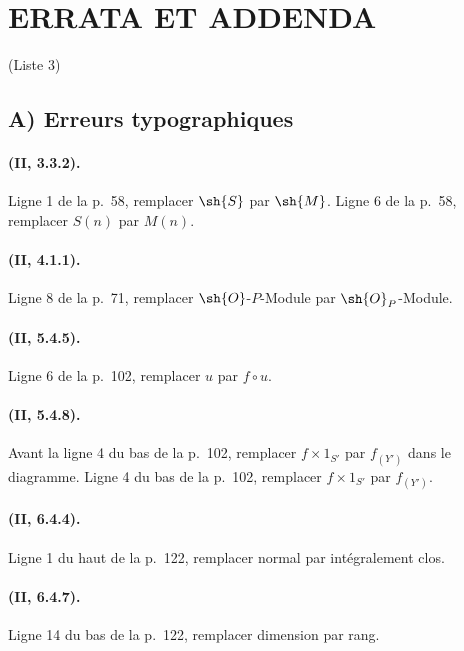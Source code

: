 {}
\section*{ERRATA ET ADDENDA}
\begin{center}\large (Liste 3)\end{center}

\subsection*{A) Erreurs typographiques}

\paragraph{(II, 3.3.2).}
Ligne 1 de la p.~58, remplacer $\sh{S}$ par $\sh{M}$. Ligne 6 de la
p.~58, remplacer $S(n)$ par $M(n)$.

\paragraph{(II, 4.1.1).}
Ligne 8 de la p.~71, remplacer $\sh{O}$-$P$-Module par
$\sh{O}_P$-Module.

\paragraph{(II, 5.4.5).}
Ligne 6 de la p.~102, remplacer $u$ par $f\circ u$.

\paragraph{(II, 5.4.8).}
Avant la ligne 4 du bas de la p.~102, remplacer $f\times1_{S'}$ par
$f_{(Y')}$ dans le diagramme. Ligne 4 du bas de la p.~102, remplacer
$f\times1_{S'}$ par $f_{(Y')}$.

\paragraph{(II, 6.4.4).}
Ligne 1 du haut de la p.~122, remplacer normal par intégralement clos.

\paragraph{(II, 6.4.7).}
Ligne 14 du bas de la p.~122, remplacer dimension par rang.

